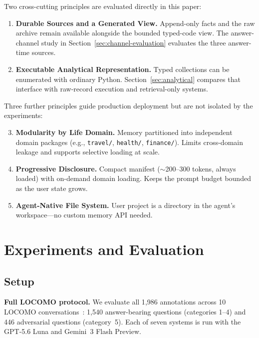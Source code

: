 \documentclass[letterpaper]{article} %
\begin{document}
Two cross-cutting principles are evaluated directly in this paper:

\begin{enumerate}
\item \textbf{Durable Sources and a Generated View.} Append-only facts and the raw archive remain available alongside the bounded typed-code view. The answer-channel study in Section~\ref{sec:channel-evaluation} evaluates the three answer-time sources.
\item \textbf{Executable Analytical Representation.} Typed collections can be enumerated with ordinary Python. Section~\ref{sec:analytical} compares that interface with raw-record execution and retrieval-only systems.
\end{enumerate}

Three further principles guide production deployment but are not isolated by the experiments:

\begin{enumerate}
  \setcounter{enumi}{2}
\item \textbf{Modularity by Life Domain.} Memory partitioned into independent domain packages (e.g., \texttt{travel/}, \texttt{health/}, \texttt{finance/}). Limits cross-domain leakage and supports selective loading at scale.
\item \textbf{Progressive Disclosure.} Compact manifest ($\sim$200--300 tokens, always loaded) with on-demand domain loading. Keeps the prompt budget bounded as the user state grows.
\item \textbf{Agent-Native File System.} User project is a directory in the agent's workspace---no custom memory API needed.
\end{enumerate}


\section{Experiments and Evaluation}
\label{sec:experiments}

\subsection{Setup}

\textbf{Full LOCOMO protocol.}\label{sec:full-locomo-protocol} We evaluate all 1{,}986 annotations across 10 LOCOMO conversations~\citep{maharana2024locomo}: 1{,}540 answer-bearing questions (categories 1--4) and 446 adversarial questions (category~5). Each of seven systems is run with the GPT-5.6 Luna and Gemini~3 Flash Preview.
\end{document}
